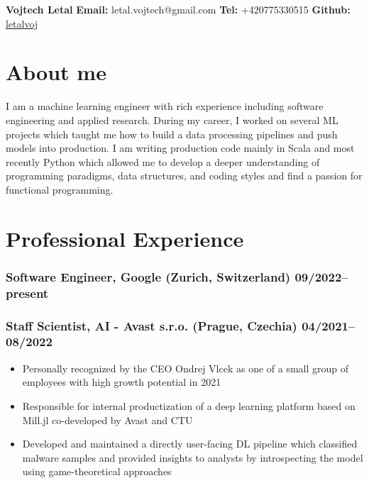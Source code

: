 \documentclass[11pt]{article}
\begin{document}
\clearpage
\thispagestyle{empty}
{\center\bfseries\huge Vojtech Letal}
\hfill
{\bf Email:} letal.vojtech@gmail.com
{\bf Tel:} +420775330515
{\bf Github:} \href{http://github.com/letalvoj}{letalvoj}

\section*{About me}
I am a machine learning engineer with rich experience including software engineering and applied research.
During my career, I worked on several ML projects which taught me how to build a data processing pipelines and push models into production.
I am writing production code mainly in Scala and most recently Python which allowed me to develop a deeper understanding of programming paradigms, data structures, and coding styles and find a passion for functional programming.

\section*{Professional Experience}
\subsubsection*{\bf Software Engineer, Google (Zurich, Switzerland) \hfill 09/2022--present}
\subsubsection*{\bf Staff Scientist, AI - Avast s.r.o. (Prague, Czechia) \hfill 04/2021--08/2022}
	 \begin{itemize}
		\setlength\itemsep{-0.25em}
		\item Personally recognized by the CEO Ondrej Vlcek as one of a small group of employees with high growth potential in 2021
		\item Responsible for internal productization of a deep learning platform based on Mill.jl co-developed by Avast and CTU
		\item Developed and maintained a directly user-facing DL pipeline which classified malware samples and provided insights to analysts by introspecting the model using game-theoretical approaches
	 \end{itemize}
\end{document}
